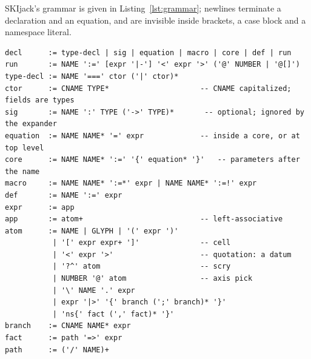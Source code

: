 \documentclass[english,submission,code=tt]{programming}
\begin{document}

SKIjack's grammar is given in
Listing~\ref{lst:grammar}; newlines terminate a
declaration and an equation, and are invisible inside brackets, a case
block and a namespace literal.

\begin{lstlisting}[frame=none,
                   label=lst:grammar,
                   float=h!,
                   caption={The grammar of the SKIjack language.},
                   basicstyle=\ttfamily\scriptsize]
decl      := type-decl | sig | equation | macro | core | def | run
run       := NAME ':=' [expr '|-'] '<' expr '>' ('@' NUMBER | '@[]')
type-decl := NAME '===' ctor ('|' ctor)*
ctor      := CNAME TYPE*                     -- CNAME capitalized; fields are types
sig       := NAME ':' TYPE ('->' TYPE)*       -- optional; ignored by the expander
equation  := NAME NAME* '=' expr             -- inside a core, or at top level
core      := NAME NAME* ':=' '{' equation* '}'   -- parameters after the name
macro     := NAME NAME* ':=*' expr | NAME NAME* ':=!' expr
def       := NAME ':=' expr
expr      := app
app       := atom+                           -- left-associative
atom      := NAME | GLYPH | '(' expr ')'
           | '[' expr expr+ ']'              -- cell
           | '<' expr '>'                    -- quotation: a datum
           | '?^' atom                       -- scry
           | NUMBER '@' atom                 -- axis pick
           | '\' NAME '.' expr
           | expr '|>' '{' branch (';' branch)* '}'
           | 'ns{' fact (',' fact)* '}'
branch    := CNAME NAME* expr
fact      := path '=>' expr
path      := ('/' NAME)+
\end{lstlisting}
\end{document}

